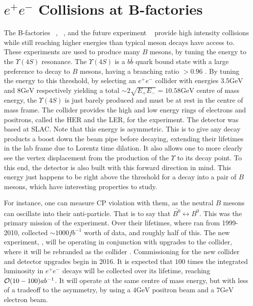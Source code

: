 \section{$e^+ e^-$ Collisions at B-factories}
\label{sec:ee_experiment}
The B-factories \babar~\cite{Boutigny:1995ib}, \belle~\cite{Cheng:1995im}, and the future experiment \belletwo~\cite{Abe:2010gxa} provide high intensity collisions while still reaching higher energies than typical meson decays have access to.
These experiments are used to produce many $B$ mesons, by tuning the energy to the $\Upsilon(4S)$ resonance.
The $\Upsilon(4S)$ is a $b\bar{b}$ quark bound state with a large preference to decay to $B$ mesons, having a branching ratio $> 0.96$ \cite{Agashe:2014kda}.
By tuning the energy to this threshold, by selecting an $e^+ e^-$ collider with energies $3.5\textrm{GeV}$ and $8\textrm{GeV}$ respectively yielding a total $\sim 2\sqrt{E_+ E_-} = 10.58\textrm{GeV}$ centre of mass energy, the $\Upsilon(4S)$ is just barely produced and must be at rest in the centre of mass frame.
The \kekb collider provides the high and low energy rings of electrons and positrons, called the HER and the LER, for the \belle experiment.
The \babar detector was based at SLAC.
Note that this energy is asymmetric.
This is to give any decay products a boost down the beam pipe before decaying, extending their lifetimes in the lab frame due to Lorentz time dilation.
It also allows one to more clearly see the vertex displacement from the production of the $\Upsilon$ to its decay point.
To this end, the detector is also built with this forward direction in mind.
This energy just happens to be right above the threshold for a decay into a pair of $B$ mesons, which have interesting properties to study.

For instance, one can measure CP violation with them, as the neutral $B$ mesons can oscillate into their anti-particle.
That is to say that $\bar{B^0} \leftrightarrow B^0$.
This was the primary mission of the \babar experiment.
Over their lifetimes, where \belle ran from 1999-2010, \belle collected $\sim 1000fb^{-1}$ worth of data, and \babar roughly half of this.
The new experiment, \belletwo, will be operating in conjunction with upgrades to the \kekb collider, where it will be rebranded as the \superkekb collider \cite{Akeroyd:2004mj}.
Commissioning for the new collider and detector upgrades begin in 2016.
It is expected that $100$ times the integrated luminosity in $e^+ e^-$ decays will be collected over its lifetime, reaching $\operatorname{\mathcal{O}}(10-100)ab^{-1}$.
It will operate at the same centre of mass energy, but with less of a tradeoff to the asymmetry, by using a $4\textrm{GeV}$ positron beam and a $7\textrm{GeV}$ electron beam.

